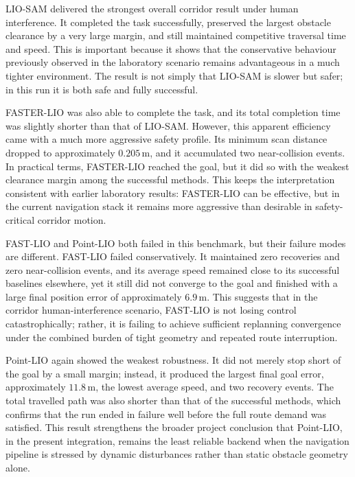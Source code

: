 \documentclass[12pt,a4paper]{report}
\begin{document}
LIO-SAM delivered the strongest overall corridor result under human interference. It completed the task successfully, preserved the largest obstacle clearance by a very large margin, and still maintained competitive traversal time and speed. This is important because it shows that the conservative behaviour previously observed in the laboratory scenario remains advantageous in a much tighter environment. The result is not simply that LIO-SAM is slower but safer; in this run it is both safe and fully successful.

FASTER-LIO was also able to complete the task, and its total completion time was slightly shorter than that of LIO-SAM. However, this apparent efficiency came with a much more aggressive safety profile. Its minimum scan distance dropped to approximately \(0.205\,\mathrm{m}\), and it accumulated two near-collision events. In practical terms, FASTER-LIO reached the goal, but it did so with the weakest clearance margin among the successful methods. This keeps the interpretation consistent with earlier laboratory results: FASTER-LIO can be effective, but in the current navigation stack it remains more aggressive than desirable in safety-critical corridor motion.

FAST-LIO and Point-LIO both failed in this benchmark, but their failure modes are different. FAST-LIO failed conservatively. It maintained zero recoveries and zero near-collision events, and its average speed remained close to its successful baselines elsewhere, yet it still did not converge to the goal and finished with a large final position error of approximately \(6.9\,\mathrm{m}\). This suggests that in the corridor human-interference scenario, FAST-LIO is not losing control catastrophically; rather, it is failing to achieve sufficient replanning convergence under the combined burden of tight geometry and repeated route interruption.

Point-LIO again showed the weakest robustness. It did not merely stop short of the goal by a small margin; instead, it produced the largest final goal error, approximately \(11.8\,\mathrm{m}\), the lowest average speed, and two recovery events. The total travelled path was also shorter than that of the successful methods, which confirms that the run ended in failure well before the full route demand was satisfied. This result strengthens the broader project conclusion that Point-LIO, in the present integration, remains the least reliable backend when the navigation pipeline is stressed by dynamic disturbances rather than static obstacle geometry alone.
\end{document}
